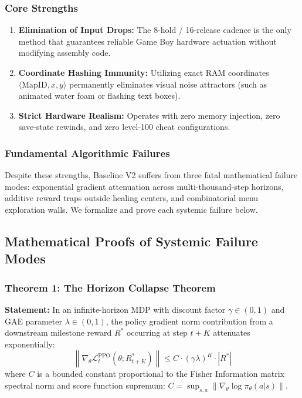 \documentclass[conference]{IEEEtran}
\begin{document}
\subsubsection{Core Strengths}
\begin{enumerate}
    \item \textbf{Elimination of Input Drops:} The 8-hold / 16-release cadence is the only method that guarantees reliable Game Boy hardware actuation without modifying assembly code.
    \item \textbf{Coordinate Hashing Immunity:} Utilizing exact RAM coordinates $\langle \text{MapID}, x, y \rangle$ permanently eliminates visual noise attractors (such as animated water foam or flashing text boxes).
    \item \textbf{Strict Hardware Realism:} Operates with zero memory injection, zero save-state rewinds, and zero level-100 cheat configurations.
\end{enumerate}

\subsubsection{Fundamental Algorithmic Failures}
Despite these strengths, Baseline V2 suffers from three fatal mathematical failure modes: exponential gradient attenuation across multi-thousand-step horizons, additive reward traps outside healing centers, and combinatorial menu exploration walls. We formalize and prove each systemic failure below.

\subsection{Mathematical Proofs of Systemic Failure Modes}

\subsubsection{Theorem 1: The Horizon Collapse Theorem}
\textbf{Statement:} In an infinite-horizon MDP with discount factor $\gamma \in (0, 1)$ and GAE parameter $\lambda \in (0, 1)$, the policy gradient norm contribution from a downstream milestone reward $R^*$ occurring at step $t+K$ attenuates exponentially:
\begin{equation}
\left\| \nabla_\theta \mathcal{L}_t^{\text{PPO}}(\theta; R_{t+K}^*) \right\| \le C \cdot (\gamma \lambda)^K \cdot |R^*|
\end{equation}
where $C$ is a bounded constant proportional to the Fisher Information matrix spectral norm and score function supremum: $C = \sup_{s, a} \|\nabla_\theta \log \pi_\theta(a | s)\|$.
\end{document}
